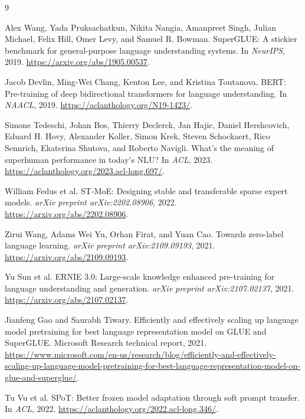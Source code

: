 \documentclass[10pt]{article}
\begin{document}

\begin{thebibliography}{9}

Alex Wang, Yada Pruksachatkun, Nikita Nangia, Amanpreet Singh, Julian
Michael, Felix Hill, Omer Levy, and Samuel R. Bowman.
\newblock SuperGLUE: A stickier benchmark for general-purpose language
understanding systems.
\newblock In \emph{NeurIPS}, 2019. \url{https://arxiv.org/abs/1905.00537}.

Jacob Devlin, Ming-Wei Chang, Kenton Lee, and Kristina Toutanova.
\newblock BERT: Pre-training of deep bidirectional transformers for language understanding.
\newblock In \emph{NAACL}, 2019. \url{https://aclanthology.org/N19-1423/}.

Simone Tedeschi, Johan Bos, Thierry Declerck, Jan Hajic, Daniel Hershcovich,
Eduard H. Hovy, Alexander Koller, Simon Krek, Steven Schockaert, Rico Sennrich,
Ekaterina Shutova, and Roberto Navigli.
\newblock What's the meaning of superhuman performance in today's NLU?
\newblock In \emph{ACL}, 2023. \url{https://aclanthology.org/2023.acl-long.697/}.

William Fedus et al.
\newblock ST-MoE: Designing stable and transferable sparse expert models.
\newblock \emph{arXiv preprint arXiv:2202.08906}, 2022.
\url{https://arxiv.org/abs/2202.08906}.

Zirui Wang, Adams Wei Yu, Orhan Firat, and Yuan Cao.
\newblock Towards zero-label language learning.
\newblock \emph{arXiv preprint arXiv:2109.09193}, 2021.
\url{https://arxiv.org/abs/2109.09193}.

Yu Sun et al.
\newblock ERNIE 3.0: Large-scale knowledge enhanced pre-training for language understanding and generation.
\newblock \emph{arXiv preprint arXiv:2107.02137}, 2021.
\url{https://arxiv.org/abs/2107.02137}.

Jianfeng Gao and Saurabh Tiwary.
\newblock Efficiently and effectively scaling up language model pretraining for best language representation model on GLUE and SuperGLUE.
\newblock Microsoft Research technical report, 2021.
\url{https://www.microsoft.com/en-us/research/blog/efficiently-and-effectively-scaling-up-language-model-pretraining-for-best-language-representation-model-on-glue-and-superglue/}.

Tu Vu et al.
\newblock SPoT: Better frozen model adaptation through soft prompt transfer.
\newblock In \emph{ACL}, 2022.
\url{https://aclanthology.org/2022.acl-long.346/}.


\end{thebibliography}
\end{document}
